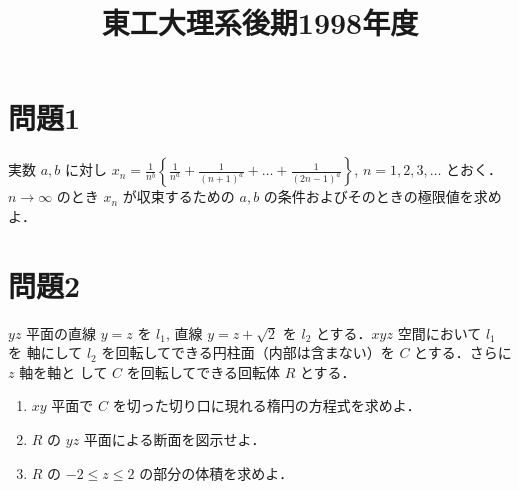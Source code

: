 \documentclass[unicode,12pt, a4paper]{ltjsarticle}%
\title{東工大理系後期1998年度}
\begin{document}
\maketitle
\section{問題1}
実数 $a, b$ に対し $x_n = \frac{1}{n^b} \left\{ \frac{1}{n^a} + \frac{1}{(n+1)^a} + \dots + \frac{1}{(2n-1)^a} \right\}$, $n=1,2,3,\dots$ とおく．$n \to \infty$ のとき $x_n$ が収束するための $a, b$ の条件およびそのときの極限値を求めよ．


\section{問題2}
$yz$ 平面の直線 $y=z$ を $l_1$, 直線 $y=z+\sqrt{2}$ を $l_2$ とする．$xyz$ 空間において $l_1$ を
軸にして $l_2$ を回転してできる円柱面（内部は含まない）を $C$ とする．さらに $z$ 軸を軸と
して $C$ を回転してできる回転体 $R$ とする．
\begin{enumerate}
    \item $xy$ 平面で $C$ を切った切り口に現れる楕円の方程式を求めよ．
    \item $R$ の $yz$ 平面による断面を図示せよ．
    \item $R$ の $-2 \le z \le 2$ の部分の体積を求めよ．
\end{enumerate}
\end{document}
